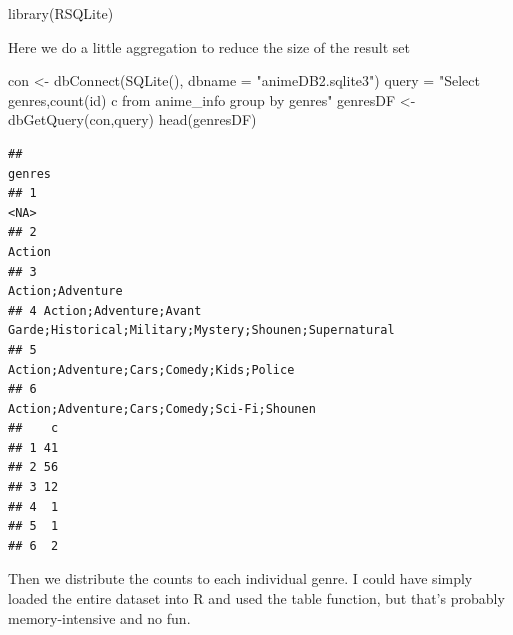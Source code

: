 \documentclass[
]{article}
\newenvironment{Shaded}{\begin{snugshade}}{\end{snugshade}}
\newcommand{\AttributeTok}[1]{\textcolor[rgb]{0.77,0.63,0.00}{#1}}
\newcommand{\FunctionTok}[1]{\textcolor[rgb]{0.00,0.00,0.00}{#1}}
\newcommand{\NormalTok}[1]{#1}
\newcommand{\OtherTok}[1]{\textcolor[rgb]{0.56,0.35,0.01}{#1}}
\newcommand{\StringTok}[1]{\textcolor[rgb]{0.31,0.60,0.02}{#1}}
\begin{document}
\begin{Shaded}
\begin{Highlighting}[]
\FunctionTok{library}\NormalTok{(RSQLite)}
\end{Highlighting}
\end{Shaded}

Here we do a little aggregation to reduce the size of the result set

\begin{Shaded}
\begin{Highlighting}[]
\NormalTok{con }\OtherTok{\textless{}{-}} \FunctionTok{dbConnect}\NormalTok{(}\FunctionTok{SQLite}\NormalTok{(), }\AttributeTok{dbname =} \StringTok{"animeDB2.sqlite3"}\NormalTok{)}
\NormalTok{query }\OtherTok{=} \StringTok{"Select genres,count(id) c from anime\_info group by genres"}
\NormalTok{genresDF }\OtherTok{\textless{}{-}} \FunctionTok{dbGetQuery}\NormalTok{(con,query)}
\FunctionTok{head}\NormalTok{(genresDF)}
\end{Highlighting}
\end{Shaded}

\begin{verbatim}
##                                                                          genres
## 1                                                                          <NA>
## 2                                                                        Action
## 3                                                              Action;Adventure
## 4 Action;Adventure;Avant Garde;Historical;Military;Mystery;Shounen;Supernatural
## 5                                      Action;Adventure;Cars;Comedy;Kids;Police
## 6                                   Action;Adventure;Cars;Comedy;Sci-Fi;Shounen
##    c
## 1 41
## 2 56
## 3 12
## 4  1
## 5  1
## 6  2
\end{verbatim}

Then we distribute the counts to each individual genre. I could have
simply loaded the entire dataset into R and used the table function, but
that's probably memory-intensive and no fun.
\end{document}
